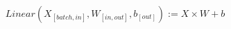 \begin{eqnarray*}
Linear(X_{[batch,in]}, W_{[in,out]}, b_{[out]}) := X \times W + b
\end{eqnarray*}
